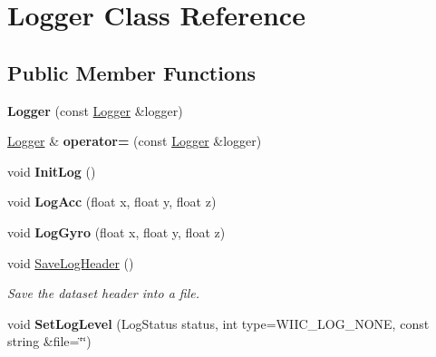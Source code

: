 \hypertarget{class_logger}{\section{\-Logger \-Class \-Reference}
\label{class_logger}
}
\subsection*{\-Public \-Member \-Functions}
\begin{DoxyCompactItemize}
\item 
\hypertarget{class_logger_a2c5d5039e76ef20903ce7cfbc8030d47}{{\bfseries \-Logger} (const \hyperlink{class_logger}{\-Logger} \&logger)}\label{class_logger_a2c5d5039e76ef20903ce7cfbc8030d47}

\item 
\hypertarget{class_logger_a400dd030dcec25d075f87202e880c5b9}{\hyperlink{class_logger}{\-Logger} \& {\bfseries operator=} (const \hyperlink{class_logger}{\-Logger} \&logger)}\label{class_logger_a400dd030dcec25d075f87202e880c5b9}

\item 
\hypertarget{class_logger_ab0e0c798082dce3c3f805a3b92baef10}{void {\bfseries \-Init\-Log} ()}\label{class_logger_ab0e0c798082dce3c3f805a3b92baef10}

\item 
\hypertarget{class_logger_a7085c6904ef225d6d3475c803c553570}{void {\bfseries \-Log\-Acc} (float x, float y, float z)}\label{class_logger_a7085c6904ef225d6d3475c803c553570}

\item 
\hypertarget{class_logger_ac667db7ddb53dff68e409858fdca1faa}{void {\bfseries \-Log\-Gyro} (float x, float y, float z)}\label{class_logger_ac667db7ddb53dff68e409858fdca1faa}

\item 
void \hyperlink{class_logger_a221bdfa77db049b43ee048d0c17abcce}{\-Save\-Log\-Header} ()
\begin{DoxyCompactList}\small\item\em \-Save the dataset header into a file. \end{DoxyCompactList}\item 
\hypertarget{class_logger_a45f7ca2bd55bfc1867f97b3e96c234d6}{void {\bfseries \-Set\-Log\-Level} (\-Log\-Status status, int type=\-W\-I\-I\-C\-\_\-\-L\-O\-G\-\_\-\-N\-O\-N\-E, const string \&file=\char`\"{}\char`\"{})}\label{class_logger_a45f7ca2bd55bfc1867f97b3e96c234d6}


\end{DoxyCompactItemize}
